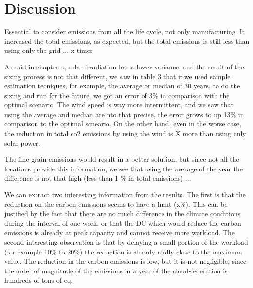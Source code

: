 


\section{Discussion}


Essential to consider emissions from all the life cycle, not only manufacturing. It increased the total emissions, as expected, but the total emissions is still less than using only the grid ... x times


As said in chapter x, solar irradiation has a lower variance, and the result of the sizing process is not that different, we saw in table 3 that if we used sample estimation tecniques, for example, the average or median of 30 years, to do the sizing and run for the future, we got an error of 3\% in comparison with the optimal scenario. The wind speed is way more intermittent, and we saw that using the average and median are nto that precise, the error grows to up 13\% in comparison to the optimal scneario. On the other hand, even in the worse case, the reduction in total co2 emissions by using the wind is X more than using only solar power.


The fine grain emissions would result in a better solution, but since not all the locations provide this information, we see that using the average of the year the difference is not that high (less than 1 \% in total emissions) ...


We can extract two interesting information from the results. The first is that the reduction on the carbon emissions seems to have a limit (x\%). This can be justified by the fact that there are no much difference in the climate conditions during the interval of one week, or that the DC which would reduce the carbon emissions is already at peak capacity and cannot receive more workload. The second interesting observation is that by delaying a small portion of the workload (for example 10\% to 20\%)  the reduction is already really close to the maximum value. The reduction in the carbon emissions is low, but it is not negligible, since the order of magnitude of the emissions in a year of the cloud-federation is hundreds of tons of  eq.

